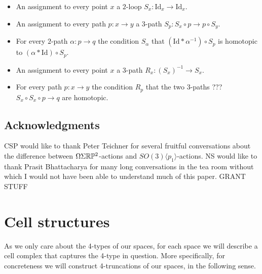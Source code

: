 \documentclass{amsart}
\begin{document}
\begin{itemize}
\item An assignment to every point $x$ a $2$-loop $S_x: \mathrm{Id}_x \rightarrow \mathrm{Id}_x$.
\item An assignment to every path $p:x \rightarrow y$ a $3$-path $S_p: S_x \circ p \rightarrow p \circ S_y$.
\item For every $2$-path $\alpha: p \rightarrow q$ the condition $S_\alpha$ that $(\mathrm{Id} \ast \alpha^{-1}) \circ S_p$ is homotopic to $(\alpha \ast \mathrm{Id}) \circ S_p$.
\end{itemize}

\begin{itemize}
\item An assignment to every point $x$ a $3$-path $R_x: (S_x)^{-1}  \rightarrow S_x$.
\item For every path $p: x \rightarrow y$ the condition $R_p$ that the two $3$-paths ??? $S_x \circ S_x \circ p \rightarrow q$ are homotopic.
\end{itemize}





\SkipTocEntry
\subsection*{Acknowledgments}
CSP would like to thank Peter Teichner for several fruitful conversations about the difference between $\Omega \Sigma \mathbb R \mathbb P^2$-actions and $SO(3)\langle p_1 \rangle$-actions.  NS would like to thank Prasit Bhattacharya for many long conversations in the tea room without which I would not have been able to understand much of this paper.  GRANT STUFF



\section{Cell structures}


As we only care about the 4-types of our spaces, for each space we will describe a cell complex that captures the 4-type in question.  More specifically, for concreteness we will construct 4-truncations of our spaces, in the following sense.
\end{document}
